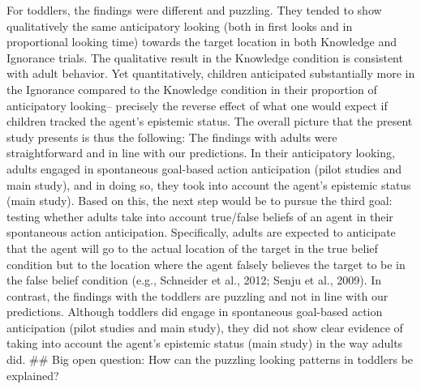 \documentclass[
  man,floatsintext]{apa6}
\begin{document}
For toddlers, the findings were different and puzzling. They tended to show qualitatively the same anticipatory looking (both in first looks and in proportional looking time) towards the target location in both Knowledge and Ignorance trials. The qualitative result in the Knowledge condition is consistent with adult behavior. Yet quantitatively, children anticipated substantially more in the Ignorance compared to the Knowledge condition in their proportion of anticipatory looking-- precisely the reverse effect of what one would expect if children tracked the agent's epistemic status.
The overall picture that the present study presents is thus the following: The findings with adults were straightforward and in line with our predictions. In their anticipatory looking, adults engaged in spontaneous goal-based action anticipation (pilot studies and main study), and in doing so, they took into account the agent's epistemic status (main study). Based on this, the next step would be to pursue the third goal: testing whether adults take into account true/false beliefs of an agent in their spontaneous action anticipation. Specifically, adults are expected to anticipate that the agent will go to the actual location of the target in the true belief condition but to the location where the agent falsely believes the target to be in the false belief condition (e.g., Schneider et al., 2012; Senju et al., 2009).
In contrast, the findings with the toddlers are puzzling and not in line with our predictions. Although toddlers did engage in spontaneous goal-based action anticipation (pilot studies and main study), they did not show clear evidence of taking into account the agent's epistemic status (main study) in the way adults did.
\#\# Big open question: How can the puzzling looking patterns in toddlers be explained?
\end{document}
